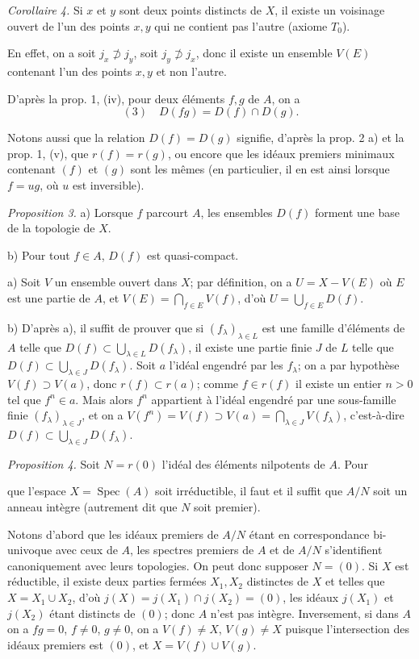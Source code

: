 \emph{Corollaire 4.} Si $x$ et $y$ sont deux points distincts de $X$, il existe un voisinage ouvert de l'un des points $x, y$ qui ne contient pas l'autre (axiome $T_0$).

En effet, on a soit $j_x \not\supset j_y$, soit $j_y \not\supset j_x$, donc il existe un ensemble $V(E)$ contenant l'un des points $x, y$ et non l'autre.

D'après la prop. 1, (iv), pour deux éléments $f, g$ de $A$, on a
$$(3) \quad D(fg) = D(f) \cap D(g).$$

Notons aussi que la relation $D(f) = D(g)$ signifie, d'après la prop. 2 a) et la prop. 1, (v), que $r(f) = r(g)$, ou encore que les idéaux premiers minimaux contenant $(f)$ et $(g)$ sont les mêmes (en particulier, il en est ainsi lorsque $f = ug$, où $u$ est inversible).

\emph{Proposition 3.} a) Lorsque $f$ parcourt $A$, les ensembles $D(f)$ forment une base de la topologie de $X$.

b) Pour tout $f \in A$, $D(f)$ est quasi-compact.

a) Soit $V$ un ensemble ouvert dans $X$; par définition, on a $U = X - V(E)$ où $E$ est une partie de $A$, et $V(E) = \bigcap_{f \in E} V(f)$, d'où $U = \bigcup_{f \in E} D(f)$.

b) D'après a), il suffit de prouver que si $(f_\lambda)_{\lambda \in L}$ est une famille d'éléments de $A$ telle que $D(f) \subset \bigcup_{\lambda \in L} D(f_\lambda)$, il existe une partie finie $J$ de $L$ telle que $D(f) \subset \bigcup_{\lambda \in J} D(f_\lambda)$. Soit $a$ l'idéal engendré par les $f_\lambda$; on a par hypothèse $V(f) \supset V(a)$, donc $r(f) \subset r(a)$; comme $f \in r(f)$ il existe un entier $n > 0$ tel que $f^n \in a$. Mais alors $f^n$ appartient à l'idéal engendré par une sous-famille finie $(f_\lambda)_{\lambda \in J}$, et on a $V(f^n) = V(f) \supset V(a) = \bigcap_{\lambda \in J} V(f_\lambda)$, c'est-à-dire $D(f) \subset \bigcup_{\lambda \in J} D(f_\lambda)$.

\emph{Proposition 4.} Soit $N = r(0)$ l'idéal des éléments nilpotents de $A$. Pour

\newpage


que l'espace $X = \operatorname{Spec}(A)$ soit irréductible, il faut et il suffit que $A/N$ soit
un anneau intègre (autrement dit que $N$ soit premier).

Notons d'abord que les idéaux premiers de $A/N$ étant en correspondance bi-
univoque avec ceux de $A$, les spectres premiers de $A$ et de $A/N$ s'identifient
canoniquement avec leurs topologies. On peut donc supposer $N = (0)$. Si $X$
est réductible, il existe deux parties fermées $X_1, X_2$ distinctes de $X$ et telles
que $X = X_1 \cup X_2$, d'où $j(X) = j(X_1) \cap j(X_2) = (0)$, les idéaux $j(X_1)$ et $j(X_2)$
étant distincts de $(0)$; donc $A$ n'est pas intègre. Inversement, si dans $A$ on
a $fg = 0$, $f \neq 0$, $g \neq 0$, on a $V(f) \neq X$, $V(g) \neq X$ puisque l'intersection des
idéaux premiers est $(0)$, et $X = V(f) \cup V(g)$.


